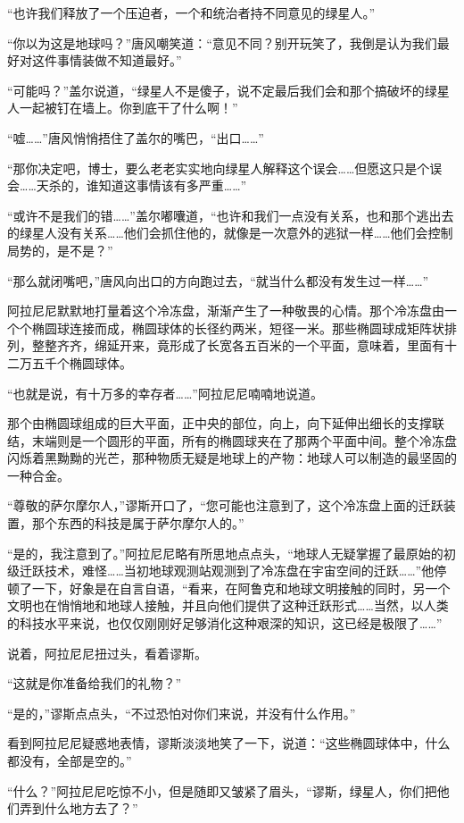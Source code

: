 “也许我们释放了一个压迫者，一个和统治者持不同意见的绿星人。”

“你以为这是地球吗？”唐风嘲笑道：“意见不同？别开玩笑了，我倒是认为我们最好对这件事情装做不知道最好。”

“可能吗？”盖尔说道，“绿星人不是傻子，说不定最后我们会和那个搞破坏的绿星人一起被钉在墙上。你到底干了什么啊！”

“嘘……”唐风悄悄捂住了盖尔的嘴巴，“出口……”

“那你决定吧，博士，要么老老实实地向绿星人解释这个误会……但愿这只是个误会……天杀的，谁知道这事情该有多严重……”

“或许不是我们的错……”盖尔嘟囔道，“也许和我们一点没有关系，也和那个逃出去的绿星人没有关系……他们会抓住他的，就像是一次意外的逃狱一样……他们会控制局势的，是不是？”

“那么就闭嘴吧，”唐风向出口的方向跑过去，“就当什么都没有发生过一样……”


阿拉尼尼默默地打量着这个冷冻盘，渐渐产生了一种敬畏的心情。那个冷冻盘由一个个椭圆球连接而成，椭圆球体的长径约两米，短径一米。那些椭圆球成矩阵状排列，整整齐齐，绵延开来，竟形成了长宽各五百米的一个平面，意味着，里面有十二万五千个椭圆球体。

“也就是说，有十万多的幸存者……”阿拉尼尼喃喃地说道。

那个由椭圆球组成的巨大平面，正中央的部位，向上，向下延伸出细长的支撑联结，末端则是一个圆形的平面，所有的椭圆球夹在了那两个平面中间。整个冷冻盘闪烁着黑黝黝的光芒，那种物质无疑是地球上的产物：地球人可以制造的最坚固的一种合金。

“尊敬的萨尔摩尔人，”谬斯开口了，“您可能也注意到了，这个冷冻盘上面的迁跃装置，那个东西的科技是属于萨尔摩尔人的。”

“是的，我注意到了。”阿拉尼尼略有所思地点点头，“地球人无疑掌握了最原始的初级迁跃技术，难怪……当初地球观测站观测到了冷冻盘在宇宙空间的迁跃……”他停顿了一下，好象是在自言自语，“看来，在阿鲁克和地球文明接触的同时，另一个文明也在悄悄地和地球人接触，并且向他们提供了这种迁跃形式……当然，以人类的科技水平来说，也仅仅刚刚好足够消化这种艰深的知识，这已经是极限了……”

说着，阿拉尼尼扭过头，看着谬斯。

“这就是你准备给我们的礼物？”

“是的，”谬斯点点头，“不过恐怕对你们来说，并没有什么作用。”

看到阿拉尼尼疑惑地表情，谬斯淡淡地笑了一下，说道：“这些椭圆球体中，什么都没有，全部是空的。”

“什么？”阿拉尼尼吃惊不小，但是随即又皱紧了眉头，“谬斯，绿星人，你们把他们弄到什么地方去了？”

